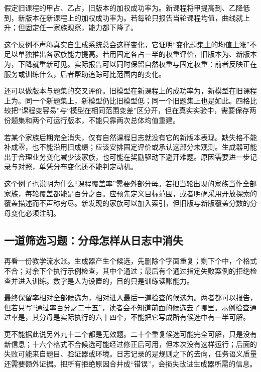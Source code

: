 假定旧课程的甲占、乙占，旧版本的加权成功率为。新课程将甲提高到、乙降低到，新版本在新课程上的加权成功率为。若每轮只报告当轮课程均值，曲线就上升；但固定任一家族观察，能力都下降了。

这个反例不声称真实自生成系统总会这样变化，它证明“变化题集上的均值上涨”不足以单独推出各家族能力提高。若用固定各占一半的权重评价，旧版本为、新版本为，下降就重新可见。实际报告可以同时保留自然权重与固定权重：前者反映正在服务或训练什么，后者帮助追踪可比范围内的变化。

还可以做版本与题集的交叉评价。旧模型在新课程上的成功率为，新模型在旧课程上为。同一个新题集上，新模型仍比旧模型低；同一个旧题集上也是如此。四格比较把“课程变容易”与“模型在相同范围变差”区分开，但在真实实验中，需要保存两份题集和两个可运行版本，不能只靠两次总体均值重建。

若某个家族后期完全消失，仅有自然课程日志就没有它的新版本表现。缺失格不能补成零，也不能沿用旧成绩；应该安排固定评价或承认这部分未观测。生成器可能出于合理业务变化减少该家族，也可能在奖励驱动下避开难题。原因需要进一步记录与对照，单凭分布变化还不能判定动机。

这个例子也说明为什么“课程覆盖率”需要外部分母。若把当轮出现的家族当作全部家族，每轮覆盖都能是百分之百。应预先定义目标范围，或者明确采用开放探索的覆盖描述而不声称穷尽。新发现的家族可以加入索引，但旧版与新版覆盖分数的分母变化必须注明。

\subsection{一道筛选习题：分母怎样从日志中消失}

再看一份教学流水账。生成器产生个候选，先删除个字面重复；剩下个中，个格式不合；对余下个执行示例检查，其中个通过；最后有个通过指定失败案例的拒绝检查并进入训练。数字是人为设置的，目的只是训练读账能力。

最终保留率相对全部候选为，相对进入最后一道检查的候选为。两者都可以报告，但若只写“通过率百分之二十五”，读者会不知道前面的候选去了哪里。示例检查通过率是，其分母是实际执行的六十四个，不能把它写成所有候选中有一半可解。

更不能据此说另外九十二个都是无效题。二十个重复候选可能完全可解，只是没有新信息；十六个格式不合候选可能经过修正后可用，但本次没有这样运行；后面的失败可能来自题目、验证器或环境。日志记录的是规则之下的去向，任务语义质量还需要额外证据。把所有拒绝原因合并成“错误”，会损失改进生成器所需的信息。


